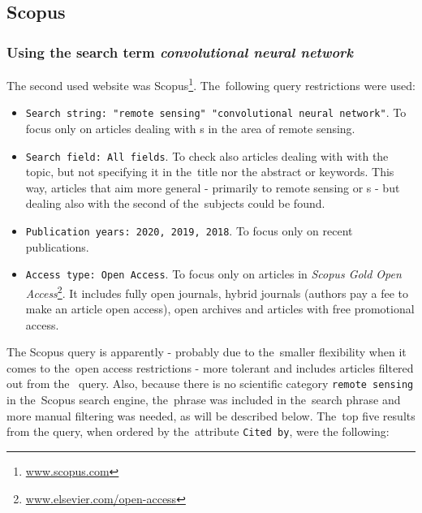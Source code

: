 \subsection{Scopus}
\label{scopus-papers}

\subsubsection{Using the search term \textit{convolutional neural network}}
\label{scopus-papers-full-length}

The second used website was Scopus\footnote{\url{www.scopus.com}}. The~following query restrictions were used:

\begin{itemize}
	\item \verb|Search string: "remote sensing" "convolutional neural network"|. To focus only on articles dealing with s in the area of remote sensing.
	\item \verb|Search field: All fields|. To check also articles dealing with with the topic, but not specifying it in the~title nor the abstract or keywords. This way, articles that aim more general - primarily to remote sensing or s - but dealing also with the second of the~subjects could be found.
	\item \verb|Publication years: 2020, 2019, 2018|. To focus only on recent publications.
	\item \verb|Access type: Open Access|. To focus only on articles in \textit{Scopus Gold Open Access}\footnote{\url{www.elsevier.com/open-access}}. It includes fully open journals, hybrid journals (authors pay a fee to make an article open access), open archives and articles with free promotional access.
\end{itemize}

\noindent The Scopus query is apparently - probably due to the~smaller flexibility when it comes to the~open access restrictions - more tolerant and includes articles filtered out from the~ query. Also, because there is no scientific category \verb|remote sensing| in the~Scopus search engine, the~phrase was included in the~search phrase and more manual filtering was needed, as will be described below. The~top five results from the query, when ordered by the~attribute \verb|Cited by|, were the following:

